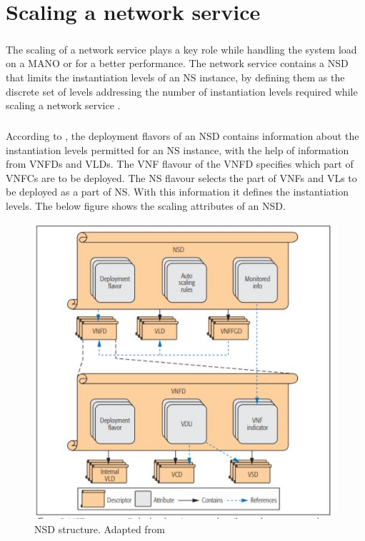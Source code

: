 \chapter{Scaling a network service}
\label{ch:Scaling a Network Service}

\paragraph{}The scaling of a network service plays a key role while handling the system load on a MANO or for a better performance. The network service contains a NSD that limits the instantiation levels of an NS instance, by defining them as the discrete set of levels addressing the number of instantiation levels required while scaling a network service \cite{adamuz2018automated}.

\paragraph{}According to \cite{adamuz2018automated}, the deployment flavors of an NSD contains information about the instantiation levels permitted for an NS instance, with the help of information from VNFDs and VLDs. The VNF flavour of the VNFD specifies which part of VNFCs are to be deployed. The NS flavour selects the part of VNFs and VLs to be deployed as a part of NS. With this information it defines the instantiation levels. The below figure shows the scaling attributes of an NSD.

\begin{figure} [H]
	\centering
	\includegraphics[width=0.6\linewidth]{"figures/NSD structure"}
	\caption{NSD structure. Adapted from \cite{adamuz2018automated}}
	\label{fig:nsd-structure}
\end{figure}




